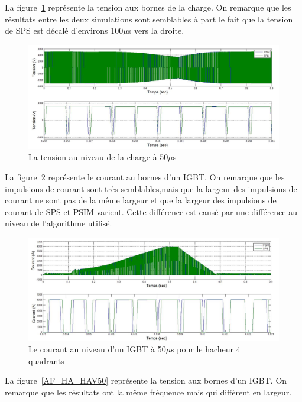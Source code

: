 \documentclass[11pt,letterpaper,final]{report}
\begin{document}
La figure~\ref{AF_HA_CHV50} représente la tension aux bornes de la charge. On remarque que les résultats entre les deux simulations sont semblables à part le fait que la tension de SPS est décalé d'environs 100$\mu$s vers la droite. 

\begin{figure}[htb]
\centering
\includegraphics[scale=0.5]{Fig/Hach_AFE/50u/hach_ten_ch.jpg}
\caption{La tension au niveau de la charge à 50$\mu$s}
\label{AF_HA_CHV50}
\end{figure}

La figure~\ref{AF_HA_HAA50} représente le courant au bornes d'un IGBT. On remarque que les impulsions de courant sont très semblables,mais que la largeur des impulsions de courant ne sont pas de la même largeur et que la largeur des impulsions de courant de SPS et PSIM varient. Cette différence est causé par une différence au niveau de l'algorithme utilisé.

\begin{figure}[htb]
\centering
\includegraphics[scale=0.5]{Fig/Hach_AFE/50u/IGBT_cou_hach.jpg}
\caption{Le courant au niveau d'un IGBT à 50$\mu$s pour le hacheur 4 quadrants}
\label{AF_HA_HAA50}
\end{figure}

La figure~\ref{AF_HA_HAV50} représente la tension aux bornes d'un IGBT. On remarque que les résultats ont la même fréquence mais qui diffèrent en largeur.
\end{document}
